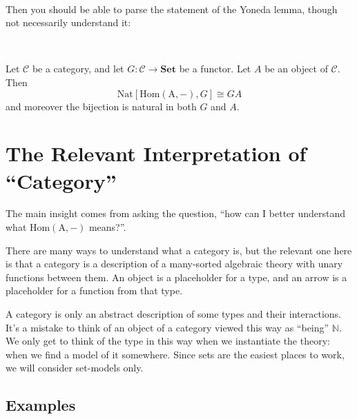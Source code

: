 \documentclass[11pt]{amsart}
\newcommand{\homfrom}[1]{\mathrm{Hom\left(#1, -\right)}}
\newcommand{\Set}{\mathbf{Set}}
\newcommand{\Nat}{\mathrm{Nat}}
\begin{document}
    \

    Then you should be able to parse the statement of the Yoneda lemma, though not necessarily understand it:

    \

    \begin{thm}
        Let $\mathcal{C}$ be a category, and let $G: \mathcal{C} \to \Set$ be a functor.
        Let $A$ be an object of $\mathcal{C}$.
        Then $$\Nat [\homfrom{A}, G] \cong G A$$
        and moreover the bijection is natural in both $G$ and $A$.
    \end{thm}

    \section{The Relevant Interpretation of ``Category''}

    The main insight comes from asking the question, ``how can I better understand what $\homfrom{A}$ means?''.

    There are many ways to understand what a category is, but the relevant one here is that a category is a description of a many-sorted algebraic theory with unary functions between them.
    An object is a placeholder for a type, and an arrow is a placeholder for a function from that type.

    A category is only an abstract description of some types and their interactions.
    It's a mistake to think of an object of a category viewed this way as ``being'' $\mathbb{N}$.
    We only get to think of the type in this way when we instantiate the theory: when we find a model of it somewhere.
    Since sets are the easiest places to work, we will consider set-models only.

    \subsection{Examples}
\end{document}
